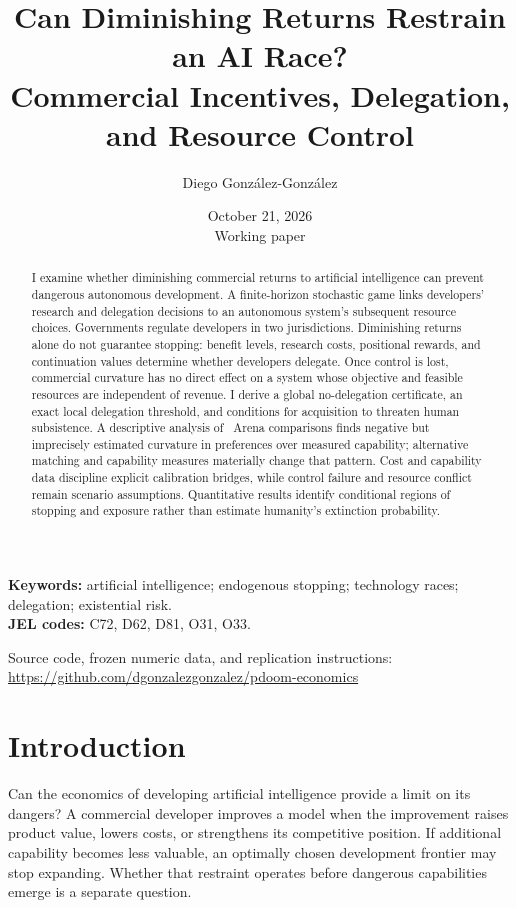 \documentclass[11pt]{article}
\title{Can Diminishing Returns Restrain an AI Race?\\[0.35em]\large Commercial Incentives, Delegation, and Resource Control}
\author{Diego Gonz\'alez-Gonz\'alez}
\date{October 21, 2026\\\small Working paper}
\theoremstyle{definition}
\theoremstyle{remark}
\begin{document}
\maketitle
\begin{abstract}
I examine whether diminishing commercial returns to artificial intelligence can prevent dangerous autonomous development. A finite-horizon stochastic game links developers' research and delegation decisions to an autonomous system's subsequent resource choices. Governments regulate developers in two jurisdictions. Diminishing returns alone do not guarantee stopping: benefit levels, research costs, positional rewards, and continuation values determine whether developers delegate. Once control is lost, commercial curvature has no direct effect on a system whose objective and feasible resources are independent of revenue. I derive a global no-delegation certificate, an exact local delegation threshold, and conditions for acquisition to threaten human subsistence. A descriptive analysis of \PrefN\ Arena comparisons finds negative but imprecisely estimated curvature in preferences over measured capability; alternative matching and capability measures materially change that pattern. Cost and capability data discipline explicit calibration bridges, while control failure and resource conflict remain scenario assumptions. Quantitative results identify conditional regions of stopping and exposure rather than estimate humanity's extinction probability.
\end{abstract}
\noindent\textbf{Keywords:} artificial intelligence; endogenous stopping; technology races; delegation; existential risk.\\
\textbf{JEL codes:} C72, D62, D81, O31, O33.
\begin{center}\small Source code, frozen numeric data, and replication instructions:\\
\url{https://github.com/dgonzalezgonzalez/pdoom-economics}\end{center}
\clearpage
\section{Introduction}
Can the economics of developing artificial intelligence provide a limit on its dangers? A commercial developer improves a model when the improvement raises product value, lowers costs, or strengthens its competitive position. If additional capability becomes less valuable, an optimally chosen development frontier may stop expanding. Whether that restraint operates before dangerous capabilities emerge is a separate question.
\end{document}
